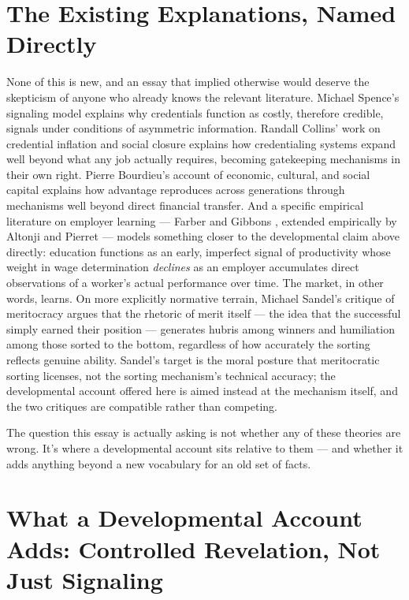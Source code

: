\documentclass[11pt]{article}
\begin{document}
\section{The Existing Explanations, Named Directly}

None of this is new, and an essay that implied otherwise would deserve the skepticism of anyone who already knows the relevant literature. Michael Spence's signaling model \cite{spence1973} explains why credentials function as costly, therefore credible, signals under conditions of asymmetric information. Randall Collins' work on credential inflation and social closure \cite{collins1979} explains how credentialing systems expand well beyond what any job actually requires, becoming gatekeeping mechanisms in their own right. Pierre Bourdieu's account of economic, cultural, and social capital \cite{bourdieu1986} explains how advantage reproduces across generations through mechanisms well beyond direct financial transfer. And a specific empirical literature on employer learning --- Farber and Gibbons \cite{farbergibbons1996}, extended empirically by Altonji and Pierret \cite{altonjipierret2001} --- models something closer to the developmental claim above directly: education functions as an early, imperfect signal of productivity whose weight in wage determination \emph{declines} as an employer accumulates direct observations of a worker's actual performance over time. The market, in other words, learns. On more explicitly normative terrain, Michael Sandel's critique of meritocracy \cite{sandel2020} argues that the rhetoric of merit itself --- the idea that the successful simply earned their position --- generates hubris among winners and humiliation among those sorted to the bottom, regardless of how accurately the sorting reflects genuine ability. Sandel's target is the moral posture that meritocratic sorting licenses, not the sorting mechanism's technical accuracy; the developmental account offered here is aimed instead at the mechanism itself, and the two critiques are compatible rather than competing.

The question this essay is actually asking is not whether any of these theories are wrong. It's where a developmental account sits relative to them --- and whether it adds anything beyond a new vocabulary for an old set of facts.

\section{What a Developmental Account Adds: Controlled Revelation, Not Just Signaling}
\end{document}
